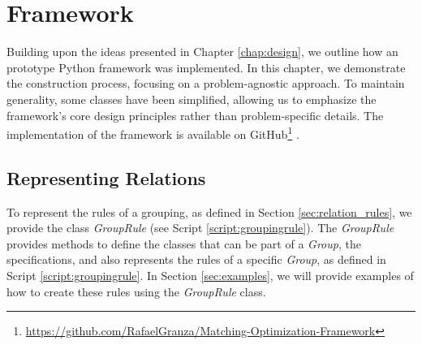 \chapter{Framework} \label{chap:framework}

    Building upon the ideas presented in Chapter \ref{chap:design}, we outline how an prototype Python framework was implemented. In this chapter, we demonstrate the construction process, focusing on a problem-agnostic approach. To maintain generality, some classes have been simplified, allowing us to emphasize the framework's core design principles rather than problem-specific details.
    The implementation of the framework is available on GitHub\footnote{\url{https://github.com/RafaelGranza/Matching-Optimization-Framework}} \cite{myframework}.

    \section{Representing Relations}
        To represent the rules of a grouping, as defined in Section \ref{sec:relation_rules}, we provide the class \textit{GroupRule} (see Script \ref{script:groupingrule}).
        The \textit{GroupRule} provides methods to define the classes that can be part of a \textit{Group}, the specifications, and also represents the rules of a specific \textit{Group}, as defined in Script \ref{script:groupingrule}.
        In Section \ref{sec:examples}, we will provide examples of how to create these rules using the \textit{GroupRule} class.

